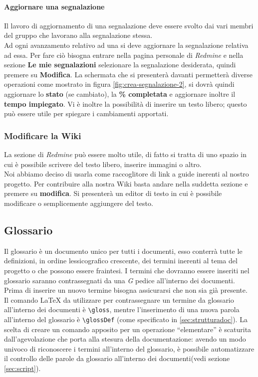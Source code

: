 \documentclass{scalatekids-article}
\begin{document}
\paragraph{Aggiornare una segnalazione}
Il lavoro di aggiornamento di una segnalazione deve essere svolto dai vari
membri del gruppo che lavorano alla segnalazione stessa.\\ Ad ogni avanzamento
relativo ad una  si deve aggiornare la segnalazione relativa ad
essa. Per fare ciò bisogna entrare nella pagina personale di \textit{Redmine} e
nella sezione \textbf{Le mie segnalazioni} selezionare la segnalazione
desiderata, quindi premere su \textbf{Modifica}. La schermata che si presenterà
davanti permetterà diverse operazioni come mostrato in figura
\ref{fig:crea-segnalazione-2}, si dovrà quindi aggiornare lo \textbf{stato} (se
cambiato), la \textbf{\% completata} e aggiornare inoltre il \textbf{tempo
  impiegato}. Vi è inoltre la possibilità di inserire un testo libero; questo
può essere utile per spiegare i cambiamenti apportati.
\subsubsection{Modificare la Wiki}
La sezione  di \textit{Redmine} può essere molto utile, di fatto si tratta di uno spazio in cui è possibile scrivere del testo libero, inserire immagini o altro.\\
Noi abbiamo deciso di usarla come raccoglitore di link a guide inerenti al nostro progetto.
Per contribuire alla nostra Wiki basta andare nella suddetta sezione e premere su \textbf{modifica}. Si presenterà un editor di testo in cui è possibile modificare o semplicemente aggiungere del testo.

\subsection{Glossario}
Il glossario è un documento unico per tutti i documenti, esso conterrà tutte le
definizioni, in ordine lessicografico crescente, dei termini inerenti al tema
del progetto o che possono essere fraintesi. I termini che dovranno essere
inseriti nel glossario saranno contrassegnati da una \textit{G} pedice
all'interno dei documenti. Prima di inserire un nuovo termine bisogna
assicurarsi che non sia già presente.\\ Il comando \LaTeX\xspace da utilizzare
per contrassegnare un termine da glossario all'interno dei documenti è
\verb=\gloss=, mentre l'inserimento di una nuova parola all'interno del
glossario è \verb=\glossDef= (come specificato in \ref{sec:strutturadoc}). La
scelta di creare un comando apposito per un operazione ``elementare'' è
scaturita dall'agevolazione che porta alla stesura della documentazione: avendo
un modo univoco di riconoscere i termini all'interno del glossario, è possibile
automatizzare il controllo delle parole da glossario all'interno dei
documenti(vedi sezione \ref{sec:script}).
\end{document}
